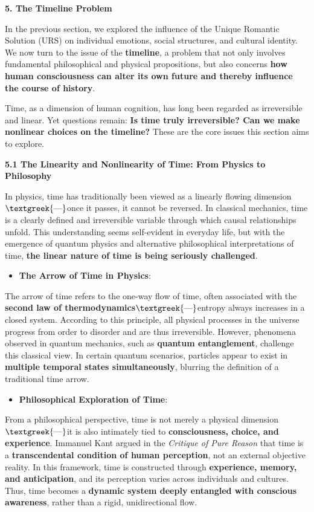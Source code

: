 \documentclass[a4paper]{article}
\begin{document}
{\centering\color[HTML]{595959}
\textbf{5. The Timeline Problem}
\par}

In the previous section, we explored the influence of the {\textquotedbl}Unique Romantic Solution{\textquotedbl} (URS)
on individual emotions, social structures, and cultural identity. We now turn to the issue of the \textbf{timeline}, a
problem that not only involves fundamental philosophical and physical propositions, but also concerns \textbf{how human
consciousness can alter its own future and thereby influence the course of history}.

Time, as a dimension of human cognition, has long been regarded as irreversible and linear. Yet questions remain:
\textbf{Is time truly irreversible? Can we make nonlinear choices on the timeline?} These are the core issues this
section aims to explore.

\textbf{5.1 The Linearity and Nonlinearity of Time: From Physics to Philosophy}

In physics, time has traditionally been viewed as a linearly flowing dimension$\text{\textgreek{—}}$once it passes, it
cannot be reversed. In classical mechanics, time is a clearly defined and irreversible variable through which causal
relationships unfold. This understanding seems self-evident in everyday life, but with the emergence of quantum physics
and alternative philosophical interpretations of time, \textbf{the linear nature of time is being seriously
challenged}.

\begin{itemize}[series=listWWNumxiii,label=[F0B7?]]
\item \textbf{The Arrow of Time in Physics}:
\end{itemize}
The {\textquotedbl}arrow of time{\textquotedbl} refers to the one-way flow of time, often associated with the
\textbf{second law of thermodynamics}$\text{\textgreek{—}}$entropy always increases in a closed system. According to
this principle, all physical processes in the universe progress from order to disorder and are thus irreversible.
However, phenomena observed in quantum mechanics, such as \textbf{quantum entanglement}, challenge this classical view.
In certain quantum scenarios, particles appear to exist in \textbf{multiple temporal states simultaneously}, blurring
the definition of a traditional time arrow.

\begin{itemize}[resume*=listWWNumxiii]
\item \textbf{Philosophical Exploration of Time}:
\end{itemize}
From a philosophical perspective, time is not merely a physical dimension$\text{\textgreek{—}}$it is also intimately
tied to \textbf{consciousness, choice, and experience}. Immanuel Kant argued in the \textit{Critique of Pure Reason}
that time is a \textbf{transcendental condition of human perception}, not an external objective reality. In this
framework, time is constructed through \textbf{experience, memory, and anticipation}, and its perception varies across
individuals and cultures. Thus, time becomes a \textbf{dynamic system deeply entangled with conscious awareness},
rather than a rigid, unidirectional flow.
\end{document}
